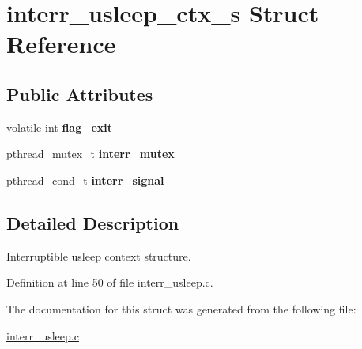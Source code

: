 \hypertarget{structinterr__usleep__ctx__s}{}\section{interr\+\_\+usleep\+\_\+ctx\+\_\+s Struct Reference}
\label{structinterr__usleep__ctx__s}
\subsection*{Public Attributes}
\begin{DoxyCompactItemize}
\item 
volatile int {\bfseries flag\+\_\+exit}\hypertarget{structinterr__usleep__ctx__s_a55c9f606789585cf0565efd920d6e0e8}{}\label{structinterr__usleep__ctx__s_a55c9f606789585cf0565efd920d6e0e8}

\item 
pthread\+\_\+mutex\+\_\+t {\bfseries interr\+\_\+mutex}\hypertarget{structinterr__usleep__ctx__s_afa299f50ed04ff08966e1e27882c4b69}{}\label{structinterr__usleep__ctx__s_afa299f50ed04ff08966e1e27882c4b69}

\item 
pthread\+\_\+cond\+\_\+t {\bfseries interr\+\_\+signal}\hypertarget{structinterr__usleep__ctx__s_a890fe7f8dcd91bf383443ff50d93c7e0}{}\label{structinterr__usleep__ctx__s_a890fe7f8dcd91bf383443ff50d93c7e0}

\end{DoxyCompactItemize}


\subsection{Detailed Description}
Interruptible usleep context structure. 

Definition at line 50 of file interr\+\_\+usleep.\+c.



The documentation for this struct was generated from the following file\+:\begin{DoxyCompactItemize}
\item 
\hyperlink{interr__usleep_8c}{interr\+\_\+usleep.\+c}\end{DoxyCompactItemize}

